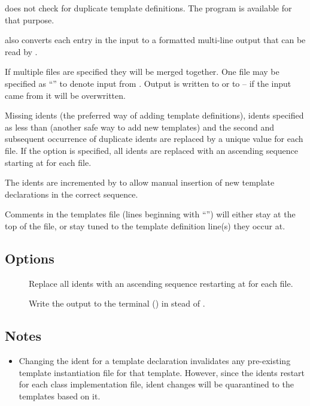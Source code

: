  does not check for duplicate template definitions. The
 program is available for that purpose.

 also converts each entry in the input to a formatted multi-line
output that can be read by .

If multiple files are specified they will be merged together.  One file may
be specified as ``\file{-}'' to denote input from .  Output is
written to  or to  -- if the input came from
 it will be overwritten.

Missing idents (the preferred way of adding template definitions), 
idents specified as less than  (another safe way to add new
templates) and the second and subsequent occurrence of
duplicate idents are replaced by a unique value for each  file.  If
the  option is specified, all idents are replaced with an ascending
sequence starting at  for each  file.

The idents are incremented by  to allow manual insertion of new
template declarations in the correct sequence.

Comments in the templates file (lines beginning with ``\code{\#}'') will
either stay at the top of the file, or stay tuned to the template definition
line(s) they occur at.

\subsection*{Options}

\begin{description}
\item[]
   Replace all idents with an ascending sequence restarting at  for
   each  file.
\item[]
   Write the output to the terminal () in stead of
   . 
\end{description}

\subsection*{Notes}

\begin{itemize}
\item
    Changing the ident for a template declaration invalidates any pre-existing
    template instantiation  file for that template.  However, since
    the idents restart for each class implementation  file, ident
    changes will be quarantined to the templates based on it.
\end{itemize}

